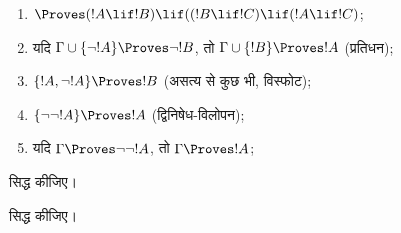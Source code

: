 \documentclass[../../../include/open-logic-section]{subfiles}
\begin{document}
\begin{prop}
\begin{enumerate}
\item $\Proves (!A \lif !B) \lif ((!B \lif !C)
  \lif (!A \lif !C)$; 
\item यदि $\Gamma \cup \{ \lnot !A\}
  \Proves \lnot !B$, तो $\Gamma \cup \{ !B\} \Proves
  !A$ (प्रतिधन); 
\item  $\{ !A, \lnot!A\} \Proves
    !B$ (असत्य से कुछ भी, विस्फोट); 
\item  $\{ \lnot\lnot!A\} \Proves
  !A$ (द्विनिषेध-विलोपन);
\item यदि $\Gamma \Proves \lnot\lnot!A$, तो $\Gamma \Proves
  !A$;
\end{enumerate}
\end{prop}

\begin{prob}
   सिद्ध कीजिए।
\end{prob}
\tagendprob

\begin{prob}
   सिद्ध कीजिए।
\end{prob}
\tagendprob
\end{document}
